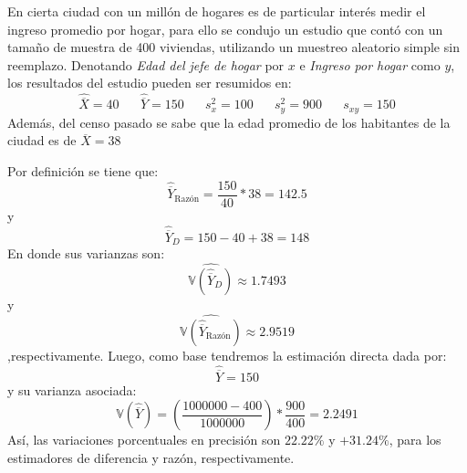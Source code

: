 
\addpoints

\question[20] En cierta ciudad con un millón de hogares es de particular interés medir el ingreso promedio por hogar, para ello se condujo un estudio que contó con un tamaño de muestra de 400 viviendas, utilizando un muestreo aleatorio simple sin reemplazo. Denotando \textit{Edad del jefe de hogar} por $x$ e \textit{Ingreso por hogar} como $y$, los resultados del estudio pueden ser resumidos en:
$$\hat{\overline{X}}=40 \hspace{20pt} \hat{\overline{Y}}=150 \hspace{20pt} s_{x}^{2}=100  \hspace{20pt} s_{y}^{2}=900  \hspace{20pt} s_{xy}=150$$
Además, del censo pasado se sabe que la edad promedio de los habitantes de la ciudad es de $\overline{X}=38$

\noaddpoints


\begin{solution}
Por definición se tiene que:
$$\hat{\overline{Y}}_{\text{Razón}}=\dfrac{150}{40}*38=142.5$$
y
$$\hat{\overline{Y}}_{D}=150-40+38=148$$
En donde sus varianzas son:
$$\widehat{\mathbb{V}(\hat{\overline{Y}}_{D})}\approx 1.7493$$
y
$$\widehat{\mathbb{V}(\hat{\overline{Y}}_{\text{Razón}})}\approx 2.9519$$
,respectivamente. Luego, como base tendremos la estimación directa dada por:
$$\hat{\overline{Y}}=150$$
y su varianza asociada:
$$\mathbb{V}(\hat{\overline{Y}})=\left(\dfrac{1000000-400}{1000000}\right)*\dfrac{900}{400}=2.2491$$
Así, las variaciones porcentuales en precisión son $22.22\%$ y $+31.24\%$, para los estimadores de diferencia y razón, respectivamente.

\end{solution}